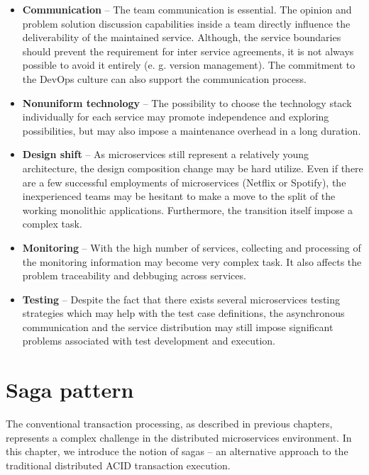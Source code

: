 \documentclass[oneside,
  digital, %
  table,   %
  lof,     %
  lot,     %
]{fithesis3}
\begin{document}
\begin{itemize}
    \item \textbf{Communication} -- The team communication is essential. The opinion and problem solution discussion capabilities inside a team directly influence the deliverability of the maintained service. Although, the service boundaries should prevent the requirement for inter service agreements, it is not always possible to avoid it entirely (e. g. version management). The commitment to the DevOps culture can also support the communication process.
    
    \item \textbf{Nonuniform technology} -- The possibility to choose the technology stack individually for each service may promote independence and exploring possibilities, but may also impose a maintenance overhead in a long duration.  
    
    \item \textbf{Design shift} -- As microservices still represent a relatively young architecture, the design composition change may be hard utilize. Even if there are a few successful employments of microservices (Netflix or Spotify), the inexperienced teams may be hesitant to make a move to the split of the working monolithic applications. Furthermore, the transition itself impose a complex task.
    
    \item \textbf{Monitoring} -- With the high number of services, collecting and processing of the monitoring information may become very complex task. It also affects the problem traceability and debbuging across services.
    
    \item \textbf{Testing} -- Despite the fact that there exists several microservices testing strategies \cite{ms_testing_strategies} which may help with the test case definitions, the asynchronous communication and the service distribution may still impose significant problems associated with test development and execution.
\end{itemize}



\clearpage
\chapter{Saga pattern}
\label{sec:saga-pattern}

The conventional transaction processing, as described in previous chapters, represents a complex challenge in the distributed microservices environment. In this chapter, we introduce the notion of sagas -- an alternative approach to the traditional distributed ACID transaction execution.
\end{document}
